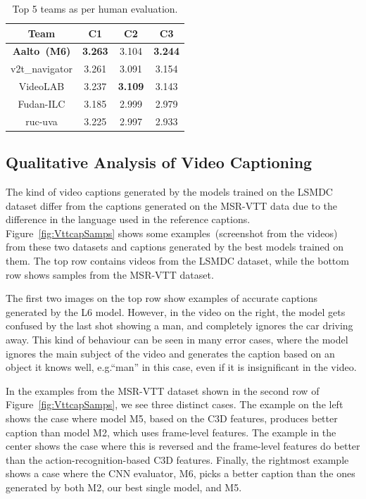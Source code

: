 \begin{table}[th]
  \centering
  \newcommand{\bs}{\small\bf}
  \begin{tabular}{||c|c|c|c|}
    \hline\hline
    \bf Team  &\bs C1 &\bs C2 &\bs C3 \\\hline\hline
    \bf Aalto~(M6)     & \bf3.263 & 3.104 & \bf3.244\\
    v2t\_navigator & 3.261 & 3.091 & 3.154 \\
    VideoLAB       & 3.237 & \bf3.109 & 3.143 \\
    Fudan-ILC      & 3.185 & 2.999 & 2.979 \\
    ruc-uva        & 3.225 & 2.997 & 2.933 \\\hline
    \hline
  \end{tabular}
  \caption{Top 5 teams as per human evaluation.}
  \label{tab:resultsTestHum}
\end{table}


\subsection{Qualitative Analysis of Video Captioning}
The kind of video captions generated by the models trained on the LSMDC dataset
differ from the captions generated on the MSR-VTT data due to the difference
in the language used in the reference captions.
Figure~\ref{fig:VttcapSamps} shows some examples~(screenshot from the
videos) from these two datasets and captions generated by the best models
trained on them.
The top row contains videos from the LSMDC dataset, while the bottom row shows
samples from the MSR-VTT dataset. 

The first two images on the top row show examples of accurate captions
generated by the L6 model.
However, in the video on the right, the model gets confused by the last shot
showing a man, and completely ignores the car driving away.
This kind of behaviour can be seen in many error cases, where the model
ignores the main subject of the video and generates the caption based on an
object it knows well, e.g.\@ ``man'' in this case, even if it is insignificant
in the video.

In the examples from the MSR-VTT dataset shown in the second row of
Figure~\ref{fig:VttcapSamps}, we see three distinct cases.
The example on the left shows the case where model M5, based on the C3D
features, produces better caption than model M2, which uses frame-level
features.
The example in the center shows the case where this is reversed and the
frame-level features do better than the action-recognition-based C3D features.
Finally, the rightmost example shows a case where the CNN evaluator, M6, picks
a better caption than the ones generated by both M2, our best single model, and
M5.

